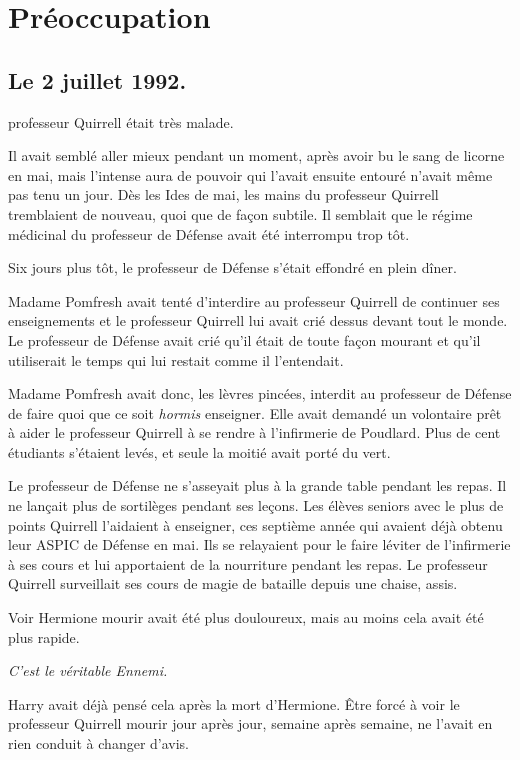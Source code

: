 \chapter{Préoccupation}

\section{Le 2 juillet 1992.}

 professeur Quirrell était très malade.

\hplettrineextrapara
Il avait semblé aller mieux pendant un moment, après avoir bu le sang de licorne en mai, mais l'intense aura de pouvoir qui l'avait ensuite entouré n'avait même pas tenu un jour. Dès les Ides de mai, les mains du professeur Quirrell tremblaient de nouveau, quoi que de façon subtile. Il semblait que le régime médicinal du professeur de Défense avait été interrompu trop tôt.

Six jours plus tôt, le professeur de Défense s'était effondré en plein dîner.

Madame Pomfresh avait tenté d'interdire au professeur Quirrell de continuer ses enseignements et le professeur Quirrell lui avait crié dessus devant tout le monde. Le professeur de Défense avait crié qu'il était de toute façon mourant et qu'il utiliserait le temps qui lui restait comme il l'entendait.

Madame Pomfresh avait donc, les lèvres pincées, interdit au professeur de Défense de faire quoi que ce soit \emph{hormis} enseigner. Elle avait demandé un volontaire prêt à aider le professeur Quirrell à se rendre à l'infirmerie de Poudlard. Plus de cent étudiants s'étaient levés, et seule la moitié avait porté du vert.

Le professeur de Défense ne s'asseyait plus à la grande table pendant les repas. Il ne lançait plus de sortilèges pendant ses leçons. Les élèves seniors avec le plus de points Quirrell l'aidaient à enseigner, ces septième année qui avaient déjà obtenu leur ASPIC de Défense en mai. Ils se relayaient pour le faire léviter de l'infirmerie à ses cours et lui apportaient de la nourriture pendant les repas. Le professeur Quirrell surveillait ses cours de magie de bataille depuis une chaise, assis.

Voir Hermione mourir avait été plus douloureux, mais au moins cela avait été plus rapide.

\emph{C'est le véritable Ennemi.}

Harry avait déjà pensé cela après la mort d'Hermione. Être forcé à voir le professeur Quirrell mourir jour après jour, semaine après semaine, ne l'avait en rien conduit à changer d'avis.


